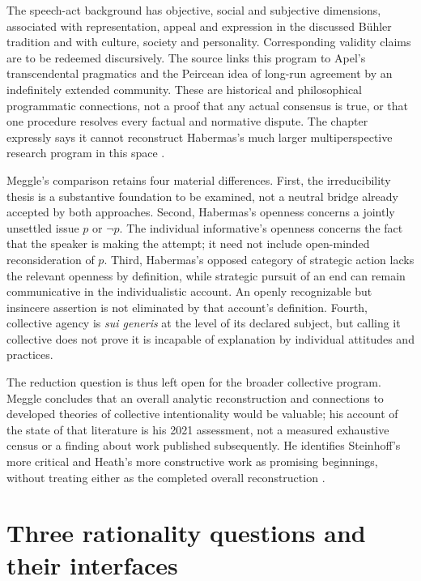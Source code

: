 The speech-act background has objective, social and subjective dimensions,
associated with representation, appeal and expression in the discussed
B\"uhler tradition and with culture, society and personality. Corresponding
validity claims are to be redeemed discursively. The source links this
program to Apel's transcendental pragmatics and the Peircean idea of
long-run agreement by an indefinitely extended community. These are
historical and philosophical programmatic connections, not a proof that
any actual consensus is true, or that one procedure resolves every factual
and normative dispute. The chapter expressly says it cannot reconstruct
Habermas's much larger multiperspective research program in this space
\cite[pp.~606--607; p.~609, n.~7]{Meggle2021RationalityCommunication}.

Meggle's comparison retains four material differences. First, the
irreducibility thesis is a substantive foundation to be examined, not a
neutral bridge already accepted by both approaches. Second, Habermas's
openness concerns a jointly unsettled issue \(p\) or \(\neg p\).
The individual informative's openness concerns the fact that the speaker
is making the attempt; it need not include open-minded reconsideration
of \(p\). Third, Habermas's opposed category of strategic action lacks
the relevant openness by definition, while strategic pursuit of an end
can remain communicative in the individualistic account. An openly
recognizable but insincere assertion is not eliminated by that account's
definition. Fourth, collective agency is \emph{sui generis} at the level
of its declared subject, but calling it collective does not prove it is
incapable of explanation by individual attitudes and practices.

The reduction question is thus left open for the broader collective
program. Meggle concludes that an overall analytic reconstruction and
connections to developed theories of collective intentionality would be
valuable; his account of the state of that literature is his 2021
assessment, not a measured exhaustive census or a finding about work
published subsequently. He identifies Steinhoff's more critical and
Heath's more constructive work as promising beginnings, without treating
either as the completed overall reconstruction
\cite[pp.~607--609]{Meggle2021RationalityCommunication}.

\section{Three rationality questions and their interfaces}

